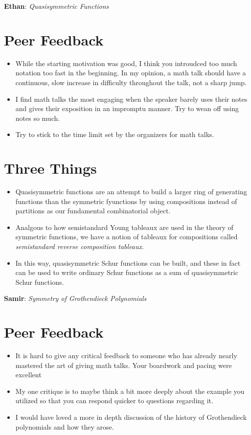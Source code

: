 \documentclass[12pt]{article}
\begin{document}
\newpage


\begin{center}
  \Large\textbf{Ethan}: \textit{Quasisymmetric Functions}
\end{center}

\section*{Peer Feedback}
\begin{itemize}
  \item While the starting motivation was good, I think you introudced too much notation too fast in the beginning. In my opinion, a math talk should have a continuous, slow increase in difficulty throughout the talk, not a sharp jump.
  \item I find math talks the most engaging when the speaker barely uses their notes and gives their exposition in an impromptu manner. Try to wean off using notes so much.
  \item Try to stick to the time limit set by the organizers for math talks.
\end{itemize}

\section*{Three Things}
\begin{itemize}
  \item Quasisymmetric functions are an attempt to build a larger ring of generating functions than the symmetric fyunctions by using compositions instead of partitions as our fundamental combinatorial object.
  \item Analgous to how semistandard Young tableaux are used in the theory of symmetric functions, we have a notion of tableaux for compositions called \textit{semistandard reverse composition tableaux}.
  \item In this way, quasisymmetric Schur functions can be built, and these in fact can be used to write ordinary Schur functions as a sum of quasisymmetric Schur functions.
\end{itemize}


\newpage

\begin{center}
  \Large\textbf{Samir}: \textit{Symmetry of Grothendieck Polynomials}
\end{center}

\section*{Peer Feedback}
\begin{itemize}
  \item It is hard to give any critical feedback to someone who has already nearly mastered the art of giving math talks. Your boardwork and pacing were excellent
  \item My one critique is to maybe think a bit more deeply about the example you utilized so that you can respond quicker to questions regarding it.
  \item I would have loved a more in depth discussion of the history of Grothendieck polynomials and how they arose.
\end{itemize}
\end{document}
